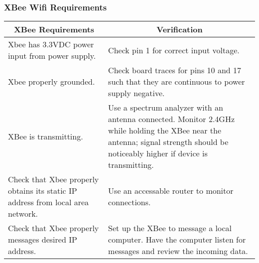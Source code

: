 \subsubsection{XBee Wifi Requirements}
\begin{tabular}{|p{}|p{}|}
\hline
\multicolumn{1}{|c|}{XBee Requirements} & \multicolumn{1}{|c|}{Verification} \\
\hline\hline
Xbee has 3.3VDC power input from power supply. & Check pin 1 for correct input voltage.\\
\hline
Xbee properly grounded. & Check board traces for pins 10 and 17 such that they are continuous to power supply negative. \\
\hline
XBee is transmitting. & Use a spectrum analyzer with an antenna connected. Monitor 2.4GHz while holding the XBee near the antenna; signal strength should be noticeably higher if device is transmitting.\\
\hline
Check that Xbee properly obtains its static IP address from local area network. & Use an accessable router to monitor connections.\\
\hline
Check that Xbee properly messages desired IP address. & Set up the XBee to message a local computer.  Have the computer listen for messages and review the incoming data.\\
\hline
\end{tabular}
